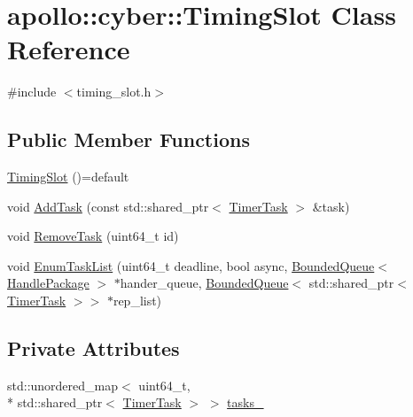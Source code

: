 \hypertarget{classapollo_1_1cyber_1_1TimingSlot}{\section{apollo\-:\-:cyber\-:\-:Timing\-Slot Class Reference}
\label{classapollo_1_1cyber_1_1TimingSlot}
}


{\ttfamily \#include $<$timing\-\_\-slot.\-h$>$}

\subsection*{Public Member Functions}
\begin{DoxyCompactItemize}
\item 
\hyperlink{classapollo_1_1cyber_1_1TimingSlot_a7d466ae28f21ce27c96ce7a721915378}{Timing\-Slot} ()=default
\item 
void \hyperlink{classapollo_1_1cyber_1_1TimingSlot_a0103051b7efc92d111aaa23d52bdbc7e}{Add\-Task} (const std\-::shared\-\_\-ptr$<$ \hyperlink{classapollo_1_1cyber_1_1TimerTask}{Timer\-Task} $>$ \&task)
\item 
void \hyperlink{classapollo_1_1cyber_1_1TimingSlot_a315c4829640231f461f6503c8e5cd27a}{Remove\-Task} (uint64\-\_\-t id)
\item 
void \hyperlink{classapollo_1_1cyber_1_1TimingSlot_a226fd34a86c5c5128bda04a66a432dde}{Enum\-Task\-List} (uint64\-\_\-t deadline, bool async, \hyperlink{classapollo_1_1cyber_1_1base_1_1BoundedQueue}{Bounded\-Queue}$<$ \hyperlink{structapollo_1_1cyber_1_1HandlePackage}{Handle\-Package} $>$ $\ast$hander\-\_\-queue, \hyperlink{classapollo_1_1cyber_1_1base_1_1BoundedQueue}{Bounded\-Queue}$<$ std\-::shared\-\_\-ptr$<$ \hyperlink{classapollo_1_1cyber_1_1TimerTask}{Timer\-Task} $>$$>$ $\ast$rep\-\_\-list)
\end{DoxyCompactItemize}
\subsection*{Private Attributes}
\begin{DoxyCompactItemize}
\item 
std\-::unordered\-\_\-map$<$ uint64\-\_\-t, \\*
std\-::shared\-\_\-ptr$<$ \hyperlink{classapollo_1_1cyber_1_1TimerTask}{Timer\-Task} $>$ $>$ \hyperlink{classapollo_1_1cyber_1_1TimingSlot_a2cdde7cc5a017a2cd2816676133864e7}{tasks\-\_\-}
\end{DoxyCompactItemize}



